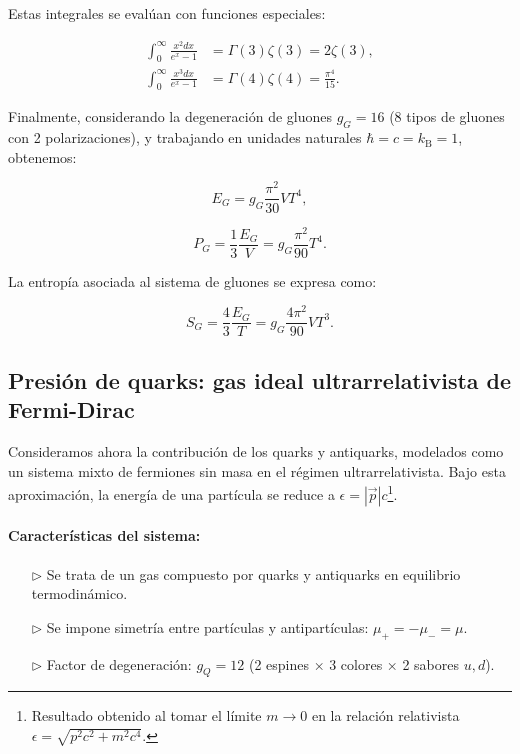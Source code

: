 Estas integrales se evalúan con funciones especiales:

\begin{align}
\int_0^\infty \frac{x^2 dx}{e^x - 1} &= \Gamma(3)\zeta(3) = 2\zeta(3), \label{eq-sol-int-N} \\
\int_0^\infty \frac{x^3 dx}{e^x - 1} &= \Gamma(4)\zeta(4) = \frac{\pi^4}{15}. \label{eq-sol-int-E}
\end{align}

Finalmente, considerando la degeneración de gluones \( g_G = 16 \) (8 tipos de gluones con 2 polarizaciones), y trabajando en unidades naturales \( \hbar = c = {k}_{\mathrm{B}} = 1 \), obtenemos:

\begin{equation}\label{eq-BE-Etotalgluons}
E_G = g_G \frac{\pi^2}{30} V T^4,
\end{equation}

\begin{equation}\label{eq-BE-Pgluons}
P_G = \frac{1}{3} \frac{E_G}{V} = g_G \frac{\pi^2}{90} T^4.
\end{equation}

La entropía asociada al sistema de gluones se expresa como:

\begin{equation}\label{eq-BE-Sgluons}
S_G = \frac{4}{3} \frac{E_G}{T} = g_G \frac{4\pi^2}{90} V T^3.
\end{equation}

\subsection{Presión de quarks: gas ideal ultrarrelativista de Fermi-Dirac}
\label{sec-Pquarks}

Consideramos ahora la contribución de los quarks y antiquarks, modelados como un sistema mixto de fermiones sin masa en el régimen ultrarrelativista. Bajo esta aproximación, la energía de una partícula se reduce a \( \epsilon = |\vec{p}| c \)\footnote{Resultado obtenido al tomar el límite \( m \to 0 \) en la relación relativista \( \epsilon = \sqrt{p^2 c^2 + m^2 c^4} \).}.

\paragraph{Características del sistema:}
\begin{itemize}
    \item[$\triangleright$] Se trata de un gas compuesto por quarks y antiquarks en equilibrio termodinámico.
    \item[$\triangleright$] Se impone simetría entre partículas y antipartículas: \( \mu_+ = -\mu_- = \mu \).
    \item[$\triangleright$] Factor de degeneración: \( g_Q = 12 \) (2 espines × 3 colores × 2 sabores \( u,d \)).
\end{itemize}

